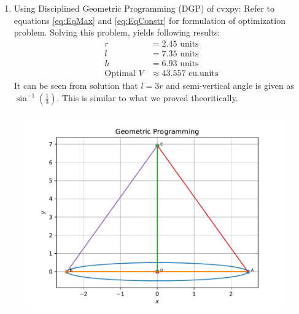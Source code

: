 \documentclass[12pt]{article}
\providecommand{\brak}[1]{\ensuremath{\left(#1\right)}}
\begin{document}
\begin{enumerate}
\begin{enumerate}
\item Using Disciplined Geometric Programming (DGP) of cvxpy: Refer to equations \eqref{eq:EqMax} and \eqref{eq:EqConstr} for formulation of optimization problem. Solving this problem, yields following results:
\begin{align}
	r &= 2.45 \text{ units} \\
	l &= 7.35 \text{ units} \\
	h &= 6.93 \text{ units} \\
	\text{Optimal } V &\approx 43.557 \text{ cu.units}
\end{align}
It can be seen from solution that $l = 3r$ and semi-vertical angle is given as $\sin^{-1}\brak{\frac{1}{3}}$. This is similar to what we proved theoritically.
\end{enumerate}
\begin{figure}[!h]
	\begin{center}
		\includegraphics[width=\columnwidth]{figs/problem26.pdf}
	\end{center}
\caption{}
\label{fig:Fig1}
\end{figure}
\end{enumerate}
\end{document}
